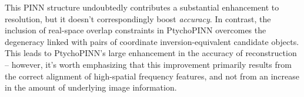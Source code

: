 \documentclass[sn-mathphys]{sn-jnl}%
\theoremstyle{thmstyleone}%
\theoremstyle{thmstyletwo}%
\theoremstyle{thmstylethree}%
\begin{document}
This PINN structure undoubtedly contributes a substantial enhancement to resolution, but it doesn't correspondingly boost \emph{accuracy}. In contrast, the inclusion of real-space overlap constraints in PtychoPINN overcomes the degeneracy linked with pairs of coordinate inversion-equivalent candidate objects. This leads to PtychoPINN's large enhancement in the accuracy of reconstruction -- however, it's worth emphasizing that this improvement primarily results from the correct alignment of high-spatial frequency features, and not from an increase in the amount of underlying image information.


%
%
%
\end{document}
